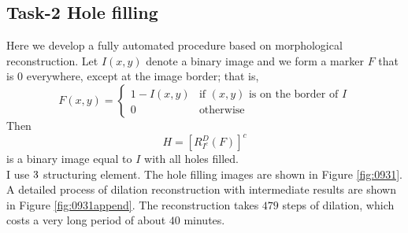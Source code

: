 \subsection{Task-2 Hole filling}
Here we develop a fully automated procedure based on morphological reconstruction. Let $I(x,y)$ denote a binary image and we form a marker $F$ that is $0$ everywhere, except at the image border; that is,
\begin{equation}
F(x, y)=\left\{
\begin{array}{rcl}
1-I(x,y) & \text{if $(x,y)$ is on the border of $I$} \\
0 & \text{otherwise} 
\end{array} \right.
\end{equation}
Then \begin{equation} H=\left[ R_{I^c}^D(F) \right]^c \end{equation} is a binary image equal to $I$ with all holes filled. \\
I use $3\time 3$ structuring element. The hole filling images are shown in Figure \ref{fig:0931}. A detailed process of dilation reconstruction with intermediate results are shown in Figure \ref{fig:0931append}. The reconstruction takes $479$ steps of dilation, which costs a very long period of about $40$ minutes. 

